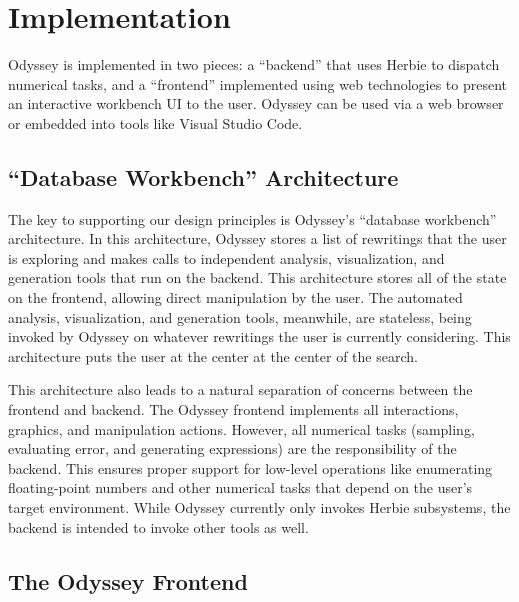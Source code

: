 \section{Implementation}

Odyssey is implemented in two pieces:
  a ``backend'' that uses Herbie to dispatch numerical tasks,
  and a ``frontend'' implemented using web technologies
  to present an interactive workbench UI to the user.
Odyssey can be used via a web browser
  or embedded into tools like
  Visual Studio Code.

\subsection{``Database Workbench'' Architecture}

The key to supporting our design principles
  is Odyssey's ``database workbench'' architecture.
In this architecture,
  Odyssey stores a list of rewritings that the user
  is exploring and makes calls to independent analysis, visualization, 
  and generation tools that run on the backend.
This architecture stores all of the state on the frontend,
  allowing direct manipulation by the user.
The automated analysis, visualization, and generation tools,
  meanwhile, are stateless,
  being invoked by Odyssey on whatever rewritings
  the user is currently considering.
This architecture puts the user at the center at the center of the search.

This architecture also leads to a natural separation of concerns
  between the frontend and backend.
The Odyssey frontend implements all interactions,
  graphics, and manipulation actions.
However, all numerical tasks
  (sampling, evaluating error, and generating expressions)
  are the responsibility of the backend.
This 
  ensures proper support for 
  low-level operations
  like enumerating floating-point numbers
  and other numerical tasks that
  depend on the user's target environment.
While Odyssey currently only invokes Herbie subsystems,
  the backend is intended to invoke other tools as well.
  
\subsection{The Odyssey Frontend}

